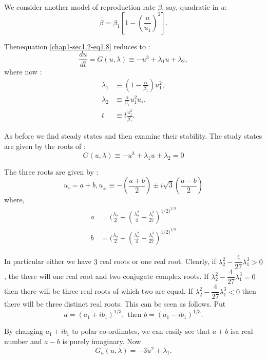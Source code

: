 We consider another model of reproduction rate $\beta$, say, quadratic
in $u$: 
\begin{equation*}
\beta = \beta_1 [1- (\frac{u}{u_1})^2].\tag {1.13}\label{chap1-sec1.2-eq1.13}
\end{equation*}

Then\pageoriginale equation \eqref{chap1-sec1.2-eq1.8} reduces to : 
\begin{equation*}
\frac{du}{d\bar{t}}= G(u, \lambda) \equiv - u^3 + \lambda_1 u+
\lambda_2, \tag{1.14} \label{chap1-sec1.2-eq1.14} 
\end{equation*}
where now :
\begin{align*}
\lambda_1  & \equiv (1-\frac{\alpha}{\beta_1}) u^2_1, \\
\lambda_2  &\equiv \frac{\alpha}{\beta_1} u_1^2 u_\circ, \\ 
t & \equiv
\bar{t}\frac{u^2_1}{\beta_1}. 
\end{align*}

As before we find steady states and then examine their stability. The study
states are given by the roots of : 
\begin{equation*}
 G(u, \lambda)\equiv - u^3 +\lambda_1 u + \lambda_2 =0
 \tag{1.15}\label{chap1-sec1.2-eq1.15} 
\end{equation*}

The three roots are given by :
\begin{equation*}
u_\circ =a+b, u_\pm \equiv - (\frac{a+b}{2})\pm
i\sqrt{3}(\frac{a-b}{2}) \tag{1.16}\label{chap1-sec1.2-eq1.16} 
\end{equation*}
where, 
\begin{align*}
a &= (\frac{\lambda_2}{2}+ (\frac {\lambda^2 _2}{4}-\frac
{\lambda^3 _1}{27})^{{1/2})^{1/3}}\\ 
b &= (\frac{\lambda_2}{2}+ (\frac {\lambda^2 _2}{4}-\frac{\lambda^3
  _1}{27})^{{1/2})^{1/3}} 
\end{align*}

In particular either we have $3$ real roots or one real root. Clearly,
if $\lambda^2_2 - \dfrac{4}{27}\lambda^3_1> 0 $, the there will one real
root and two conjugate complex roots. If $\lambda_2^2 - \dfrac{4}{27}
\lambda_1^3 = 0$ then there will be three real roots of which two are
equal. If $\lambda^2_2 - \dfrac{4}{27}\lambda^3_1 < 0$ then there will
be three distinct real roots. This can be seen as follows. Put  
$$
a= (a_1 + ib_1)^{1/3}, \text{ then } b =  (a_1 -  ib_1)^{1/3}. 
$$

By changing $a_1 + ib_1$ to polar co-ordinates, we can easily see that
$a+b$ 
is\pageoriginale a real number and $a-b$ is purely imaginary. Now 
$$
G_{u}(u, \lambda) = -3u^{2} + \lambda_{1}.
$$

